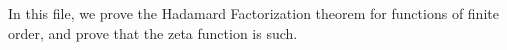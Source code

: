 

In this file, we prove the Hadamard Factorization theorem for functions of finite order, and prove that the zeta function
is such.


